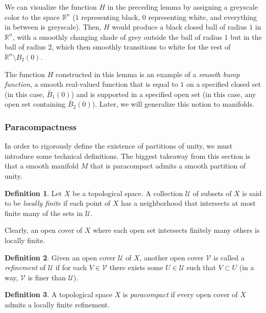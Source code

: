 \documentclass{article}
\theoremstyle{remark}
\theoremstyle{definition}
\newtheorem{definition}{Definition}[section]
\begin{document}
    We can visualize the function $H$ in the preceding lemma by assigning a greyscale color to the space $\mathbb{R}^n$ ($1$ representing black, $0$ representing white, and everything in between is greyscale). Then, $H$ would produce a black closed ball of radius $1$ in $\mathbb{R}^n$, with a smoothly changing shade of grey outside the ball of radius $1$ but in the ball of radius $2$, which then smoothly transitions to white for the rest of $\mathbb{R}^n \setminus B_2 (0)$. 

    The function $H$ constructed in this lemma is an example of a \textit{smooth bump function}, a smooth real-valued function that is equal to $1$ on a specified closed set (in this case, $\bar{B}_1 (0)$) and is supported in a specified open set (in this case, any open set containing $\bar{B}_2 (0)$). Later, we will generalize this notion to manifolds. 

    \subsubsection{Paracompactness}

      In order to rigorously define the existence of partitions of unity, we must introduce some technical definitions. The biggest takeaway from this section is that a smooth manifold $M$ that is paracompact admits a smooth partition of unity. 

      \begin{definition}
        Let $X$ be a topological space. A collection $\mathcal{U}$ of subsets of $X$ is said to be \textit{locally finite} if each point of $X$ has a neighborhood that intersects at most finite many of the sets in $\mathcal{U}$. 

        Clearly, an open cover of $X$ where each open set intersects finitely many others is locally finite.
      \end{definition}

      \begin{definition}
        Given an open cover $\mathcal{U}$ of $X$, another open cover $\mathcal{V}$ is called a \textit{refinement} of $\mathcal{U}$ if for each $V \in \mathcal{V}$ there exists some $U \in \mathcal{U}$ such that $V \subset U$ (in a way, $\mathcal{V}$ is finer than $\mathcal{U}$).  
      \end{definition}

      \begin{definition}
        A topological space $X$ is \textit{paracompact} if every open cover of $X$ admits a locally finite refinement. 
      \end{definition}
\end{document}
